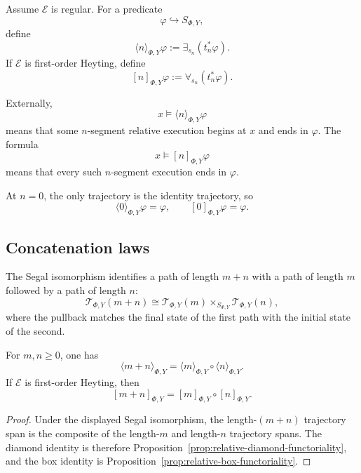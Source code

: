 \begin{definition}
\label{def:dynamic-finite-horizon-endpoint-modalities}
Assume \(\mathcal E\) is regular.  For a predicate
\[
    \varphi\hookrightarrow S_{\Phi,Y},
\]
define
\[
    \langle n\rangle_{\Phi,Y}\varphi
    :=
    \exists_{s_n}(t_n^\ast\varphi).
\]
If \(\mathcal E\) is first-order Heyting, define
\[
    [n]_{\Phi,Y}\varphi
    :=
    \forall_{s_n}(t_n^\ast\varphi).
\]
\end{definition}

Externally,
\[
    x\models\langle n\rangle_{\Phi,Y}\varphi
\]
means that some \(n\)-segment relative execution begins at \(x\) and ends in
\(\varphi\).  The formula
\[
    x\models[n]_{\Phi,Y}\varphi
\]
means that every such \(n\)-segment execution ends in \(\varphi\).

At \(n=0\), the only trajectory is the identity trajectory, so
\[
    \langle0\rangle_{\Phi,Y}\varphi=\varphi,
    \qquad
    [0]_{\Phi,Y}\varphi=\varphi.
\]

\subsection{Concatenation laws}
\label{subsec:dynamic-trajectory-concatenation-laws}

The Segal isomorphism identifies a path of length \(m+n\) with a path of
length \(m\) followed by a path of length \(n\):
\[
    \mathscr T_{\Phi,Y}(m+n)
    \cong
    \mathscr T_{\Phi,Y}(m)
    \times_{S_{\Phi,Y}}
    \mathscr T_{\Phi,Y}(n),
\]
where the pullback matches the final state of the first path with the initial
state of the second.

\begin{proposition}
\label{prop:dynamic-finite-horizon-composition}
For \(m,n\geq0\), one has
\[
    \langle m+n\rangle_{\Phi,Y}
    =
    \langle m\rangle_{\Phi,Y}
    \circ
    \langle n\rangle_{\Phi,Y}.
\]
If \(\mathcal E\) is first-order Heyting, then
\[
    [m+n]_{\Phi,Y}
    =
    [m]_{\Phi,Y}
    \circ
    [n]_{\Phi,Y}.
\]
\end{proposition}

\begin{proof}
Under the displayed Segal isomorphism, the length-\((m+n)\) trajectory span
is the composite of the length-\(m\) and length-\(n\) trajectory spans.
The diamond identity is therefore
Proposition~\ref{prop:relative-diamond-functoriality}, and the box identity is
Proposition~\ref{prop:relative-box-functoriality}.
\end{proof}

